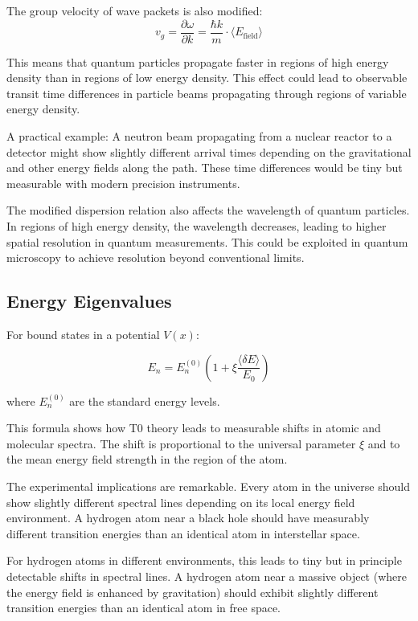 \documentclass[12pt,a4paper]{article}
\newcommand{\deltaE}{\delta E}
\newcommand{\xipar}{\xi}
\theoremstyle{definition}
\theoremstyle{remark}
\begin{document}
The group velocity of wave packets is also modified:
$$v_g = \frac{\partial \omega}{\partial k} = \frac{\hbar k}{m} \cdot \langle E_{\text{field}} \rangle$$

This means that quantum particles propagate faster in regions of high energy density than in regions of low energy density. This effect could lead to observable transit time differences in particle beams propagating through regions of variable energy density.

A practical example: A neutron beam propagating from a nuclear reactor to a detector might show slightly different arrival times depending on the gravitational and other energy fields along the path. These time differences would be tiny but measurable with modern precision instruments.

The modified dispersion relation also affects the wavelength of quantum particles. In regions of high energy density, the wavelength decreases, leading to higher spatial resolution in quantum measurements. This could be exploited in quantum microscopy to achieve resolution beyond conventional limits.

\subsection{Energy Eigenvalues}

For bound states in a potential $V(x)$:

\begin{equation}
	E_n = E_n^{(0)} \left(1 + \xipar \frac{\langle \deltaE \rangle}{E_0}\right)
	\label{eq:energy_shift}
\end{equation}

where $E_n^{(0)}$ are the standard energy levels.

This formula shows how T0 theory leads to measurable shifts in atomic and molecular spectra. The shift is proportional to the universal parameter $\xipar$ and to the mean energy field strength in the region of the atom.

The experimental implications are remarkable. Every atom in the universe should show slightly different spectral lines depending on its local energy field environment. A hydrogen atom near a black hole should have measurably different transition energies than an identical atom in interstellar space.

For hydrogen atoms in different environments, this leads to tiny but in principle detectable shifts in spectral lines. A hydrogen atom near a massive object (where the energy field is enhanced by gravitation) should exhibit slightly different transition energies than an identical atom in free space.
\end{document}

